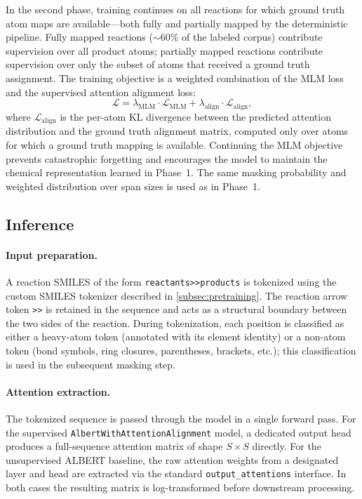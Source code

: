 \documentclass[12pt]{article}
\begin{document}
In the second phase, training continues on all reactions for which
ground truth atom maps are available---both fully and partially mapped
by the deterministic pipeline.  Fully mapped reactions ($\sim$60\% of
the labeled corpus) contribute supervision over all product atoms;
partially mapped reactions contribute supervision over only the subset
of atoms that received a ground truth assignment.  The training
objective is a weighted combination of the MLM loss and the supervised
attention alignment loss:
\begin{equation}
  \mathcal{L} = \lambda_{\mathrm{MLM}} \cdot \mathcal{L}_{\mathrm{MLM}}
  + \lambda_{\mathrm{align}} \cdot \mathcal{L}_{\mathrm{align}},
  \label{eq:loss}
\end{equation}
where $\mathcal{L}_{\mathrm{align}}$ is the per-atom KL divergence
between the predicted attention distribution and the ground truth
alignment matrix, computed only over atoms for which a ground truth
mapping is available.  Continuing the MLM objective prevents
catastrophic forgetting and encourages the model to maintain the
chemical representation learned in Phase~1.  The same masking probability
and weighted distribution over span sizes is used as in Phase~1.


\subsection{Inference}
\label{subsec:inference}

\paragraph{Input preparation.}
A reaction SMILES of the form \texttt{reactants>>products} is tokenized
using the custom SMILES tokenizer described in \cref{subsec:pretraining}.
The reaction arrow token \texttt{>>} is retained in the sequence and acts
as a structural boundary between the two sides of the reaction.
During tokenization, each position is classified as either a heavy-atom token
(annotated with its element identity) or a non-atom token (bond symbols, ring
closures, parentheses, brackets, etc.); this classification is used in the
subsequent masking step.

\paragraph{Attention extraction.}
The tokenized sequence is passed through the model in a single forward pass.
For the supervised \texttt{AlbertWithAttentionAlignment} model, a dedicated
output head produces a full-sequence attention matrix of shape
$S \times S$ directly.
For the unsupervised ALBERT baseline, the raw attention weights from a
designated layer and head are extracted via
the standard \texttt{output\_attentions} interface.
In both cases the resulting matrix is log-transformed before downstream
processing.
\end{document}
